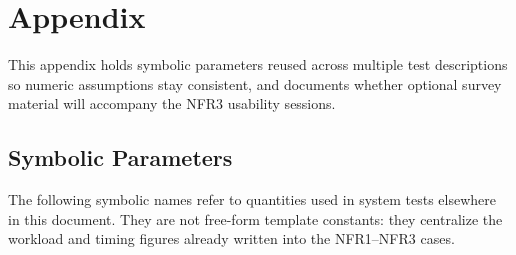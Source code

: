 \documentclass[12pt, titlepage]{article}
\begin{document}




\newpage

\section{Appendix}

This appendix holds symbolic parameters reused across multiple test descriptions so numeric assumptions stay consistent, and documents whether optional survey material will accompany the NFR3 usability sessions.

\subsection{Symbolic Parameters}

The following symbolic names refer to quantities used in system tests elsewhere in this document. They are not free-form template constants: they centralize the workload and timing figures already written into the NFR1--NFR3 cases.
\end{document}
